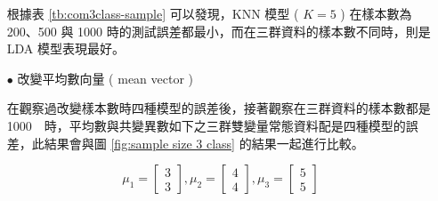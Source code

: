 \begin{itemize}
\renewcommand\arraystretch{1.5}
\begin{table}[h]
\scriptsize
\setlength{\belowcaptionskip}{0pt}
\centering
\caption{Error Rate of three Methods of changing sample size for three classes}\label{tb:com3class-sample}
\end{table}

根據表 \ref{tb:com3class-sample} 可以發現，KNN 模型 ( $K=5$ ) 在樣本數為 200、500 與 1000 時的測試誤差都最小，而在三群資料的樣本數不同時，則是 LDA 模型表現最好。


\item[$\bullet$] 改變平均數向量 ( mean vector )

在觀察過改變樣本數時四種模型的誤差後，接著觀察在三群資料的樣本數都是 1000　時，平均數與共變異數如下之三群雙變量常態資料配是四種模型的誤差，此結果會與圖 \ref{fig:sample size 3 class} 的結果一起進行比較。

$$ \mu_1 = \left[
            \begin{array}{clr}
                3  \\
                3 
            \end{array} \right] ,
            \mu_2 = \left[
            \begin{array}{clr}
                4  \\
                4 
            \end{array} \right],
            \mu_3 = \left[
            \begin{array}{clr}
                5  \\
                5 
            \end{array} \right]$$ 


\end{itemize}
